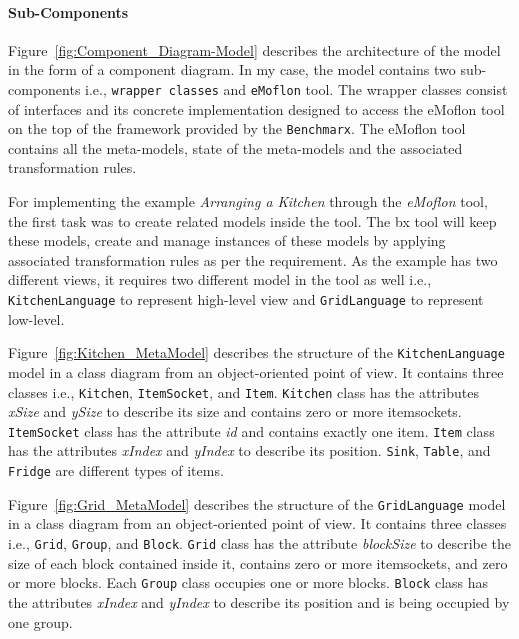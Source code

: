 \paragraph{Sub-Components}
Figure~\ref{fig:Component_Diagram-Model} describes the architecture of the model in the form of a component diagram. In my case, the model contains two sub-components i.e., \texttt{wrapper classes} and \texttt{eMoflon} tool. The wrapper classes consist of interfaces and its concrete implementation designed to access the eMoflon tool on the top of the framework provided by the \texttt{Benchmarx}. The eMoflon tool contains all the meta-models, state of the meta-models and the associated transformation rules.

For implementing the example \textit{Arranging a Kitchen} through the \textit{eMoflon} tool, the first task was to create related models inside the tool. The bx tool will keep these models, create and manage instances of these models by applying associated transformation rules as per the requirement. As the example has two different views, it requires two different model in the tool as well i.e., \texttt{KitchenLanguage} to represent high-level view and \texttt{GridLanguage} to represent low-level.

Figure~\ref{fig:Kitchen_MetaModel} describes the structure of the \texttt{KitchenLanguage} model in a class diagram from an object-oriented point of view. It contains three classes i.e., \texttt{Kitchen}, \texttt{ItemSocket}, and \texttt{Item}. \texttt{Kitchen} class has the attributes \textit{xSize} and \textit{ySize} to describe its size and contains zero or more itemsockets. \texttt{ItemSocket} class has the attribute \textit{id} and contains exactly one item. \texttt{Item} class has the attributes \textit{xIndex} and \textit{yIndex} to describe its position. \texttt{Sink}, \texttt{Table}, and \texttt{Fridge} are different types of items.

Figure~\ref{fig:Grid_MetaModel} describes the structure of the \texttt{GridLanguage} model in a class diagram from an object-oriented point of view. It contains three classes i.e., \texttt{Grid}, \texttt{Group}, and \texttt{Block}. \texttt{Grid} class has the attribute \textit{blockSize} to describe the size of each block contained inside it, contains zero or more itemsockets, and zero or more blocks. Each \texttt{Group} class occupies one or more blocks. \texttt{Block} class has the attributes \textit{xIndex} and \textit{yIndex} to describe its position and is being occupied by one group.

